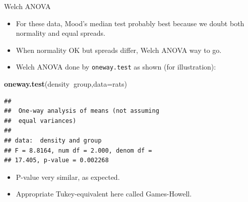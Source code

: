 \documentclass[
  ignorenonframetext,
]{beamer}
\newenvironment{Shaded}{\begin{snugshade}}{\end{snugshade}}
\newcommand{\DataTypeTok}[1]{\textcolor[rgb]{0.13,0.29,0.53}{#1}}
\newcommand{\KeywordTok}[1]{\textcolor[rgb]{0.13,0.29,0.53}{\textbf{#1}}}
\newcommand{\NormalTok}[1]{#1}
\newcommand{\OperatorTok}[1]{\textcolor[rgb]{0.81,0.36,0.00}{\textbf{#1}}}
\providecommand{\tightlist}{%
  \setlength{\itemsep}{0pt}\setlength{\parskip}{0pt}}
\begin{document}
\begin{frame}[fragile]{Welch ANOVA}
\protect\hypertarget{welch-anova}{}

\begin{itemize}
\tightlist
\item
  For these data, Mood's median test probably best because we doubt both
  normality and equal spreads.
\item
  When normality OK but spreads differ, Welch ANOVA way to go.
\item
  Welch ANOVA done by \texttt{oneway.test} as shown (for illustration):
\end{itemize}

\begin{Shaded}
\begin{Highlighting}[]
\KeywordTok{oneway.test}\NormalTok{(density}\OperatorTok{~}\NormalTok{group,}\DataTypeTok{data=}\NormalTok{rats)}
\end{Highlighting}
\end{Shaded}

\begin{verbatim}
## 
##  One-way analysis of means (not assuming
##  equal variances)
## 
## data:  density and group
## F = 8.8164, num df = 2.000, denom df =
## 17.405, p-value = 0.002268
\end{verbatim}

\begin{itemize}
\tightlist
\item
  P-value very similar, as expected.
\item
  Appropriate Tukey-equivalent here called Games-Howell.
\end{itemize}

\end{frame}
\end{document}
